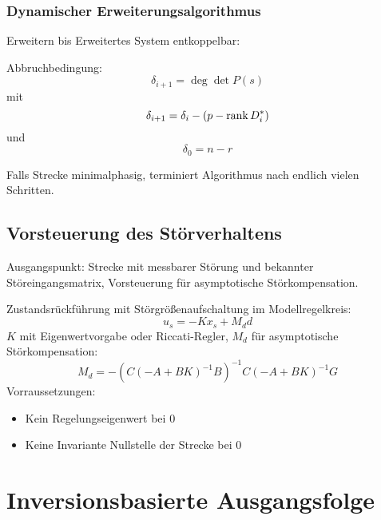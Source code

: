 \subsubsection{Dynamischer Erweiterungsalgorithmus}
Erweitern bis Erweitertes System entkoppelbar:

Abbruchbedingung: 
\begin{equation}
    \delta_{i+1} = \deg \det P(s)
\end{equation}
mit
\begin{equation}
    \delta_{i+1} = \delta_i - (p - \operatorname*{rank} D^*_i)
\end{equation}
und
\begin{equation}
    \delta_0 = n - r
\end{equation}

Falls Strecke minimalphasig, terminiert Algorithmus nach endlich vielen Schritten.

\subsection{Vorsteuerung des Störverhaltens}
Ausgangspunkt: Strecke mit messbarer Störung und bekannter Störeingangsmatrix,
Vorsteuerung für asymptotische Störkompensation.

Zustandsrückführung mit Störgrößenaufschaltung im Modellregelkreis:
\begin{equation}
    u_s = -K x_s + M_d d
\end{equation}
$K$ mit Eigenwertvorgabe oder Riccati-Regler, $M_d$ für asymptotische Störkompensation:
\begin{equation}
    M_d = -{\left(C{(-A+BK)}^{-1} B\right)}^{-1} C {(-A + BK)}^{-1}G
\end{equation}
Vorraussetzungen:
\begin{itemize}
    \item Kein Regelungseigenwert bei $0$
    \item Keine Invariante Nullstelle der Strecke bei $0$
\end{itemize}

\section{Inversionsbasierte Ausgangsfolge}
